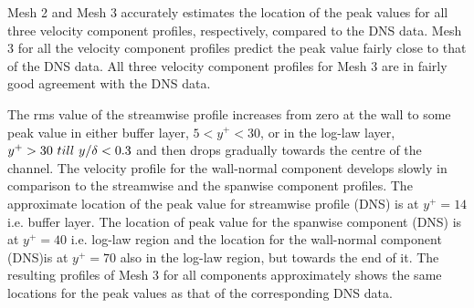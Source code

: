 Mesh 2 and Mesh 3 accurately estimates the location of the peak values for all three velocity component profiles, respectively, compared to the DNS data. Mesh 3 for all the velocity component profiles predict the peak value fairly close to that of the DNS data. All three velocity component profiles for Mesh 3 are in fairly good agreement with the DNS data. 

The rms value of the streamwise profile increases from zero at the wall to some peak value in either buffer layer, $5<y^+< 30$, or in the log-law layer, $y^+ > 30\  till\  y/\delta <0.3$ and then drops gradually towards the centre of the channel. The velocity profile for the wall-normal component develops slowly in comparison to the streamwise and the spanwise component profiles. The approximate location of the peak value for streamwise profile (DNS) is at $y^+ = 14$ \cite{kim:moin:moser:87} i.e. buffer layer. The location of peak value for the spanwise component (DNS) is at $y^+ = 40$ i.e. log-law region and the location for the wall-normal component (DNS)is at $y^+ = 70$ also in the log-law region, but towards the end of it. The resulting profiles of Mesh 3 for all components approximately shows the same locations for the peak values as that of the corresponding DNS data.
%
